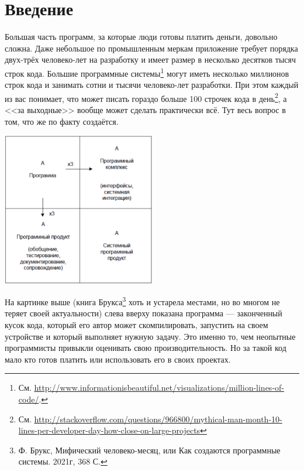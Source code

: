 \documentclass{../../text-style}
\begin{document}
\maketitle
\thispagestyle{empty}

\section{Введение}

Большая часть программ, за которые люди готовы платить деньги, довольно сложна. Даже небольшое по промышленным меркам приложение требует порядка двух-трёх человеко-лет на разработку и имеет размер в несколько десятков тысяч строк кода. Большие программные системы\footnote{См. \url{http://www.informationisbeautiful.net/visualizations/million-lines-of-code/}.} могут иметь несколько миллионов строк кода и занимать сотни и тысячи человеко-лет разработки. При этом каждый из вас понимает, что может писать гораздо больше 100 строчек кода в день\footnote{См. \url{http://stackoverflow.com/questions/966800/mythical-man-month-10-lines-per-developer-day-how-close-on-large-projects}}, а <<за выходные>> вообще может сделать практически всё. Тут весь вопрос в том, что же по факту создаётся.

\begin{center}
    \includegraphics[width=0.5\textwidth]{brooksSquare.png}
\end{center}

На картинке выше (книга Брукса\footnote{Ф. Брукс, Мифический человеко-месяц, или Как создаются программные системы. 2021г, 368 С.} хоть и устарела местами, но во многом не теряет своей актуальности) слева вверху показана программа --- законченный кусок кода, который его автор может скомпилировать, запустить на своем устройстве и который выполняет нужную задачу. Это именно то, чем неопытные программисты привыкли оценивать свою производительность. Но за такой код мало кто готов платить или использовать его в своих проектах.
\end{document}

